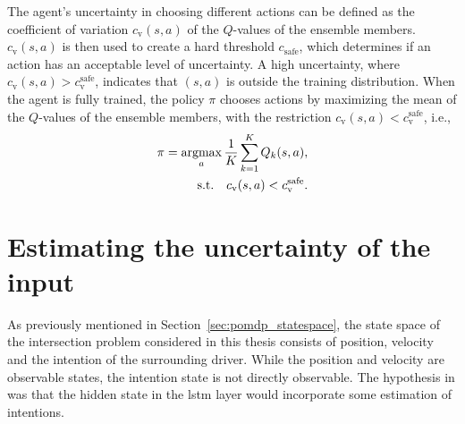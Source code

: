 The agent's uncertainty in choosing different actions can be defined as the coefficient of variation $c_\mathrm{v}(s,a)$ of the $Q$-values of the ensemble members. $c_\mathrm{v}(s,a)$ is then used to create a hard threshold $c_\mathrm{safe}$, which determines if an action has an acceptable level of uncertainty. 
A high uncertainty, where $c_\mathrm{v}(s,a) > c_\mathrm{v}^\mathrm{safe}$, indicates that $(s,a)$ is outside the training distribution. 
When the agent is fully trained, the policy $\pi$ chooses actions by maximizing the mean of the $Q$-values of the ensemble members, with the restriction $c_\mathrm{v}(s,a) < c_\mathrm{v}^\mathrm{safe}$, i.e.,
%
\begin{equation}
	\begin{aligned}
		\pi = \operatorname*{argmax}_{a} \frac{1}{K} \sum_{k=1}^K Q_k(s,a),\\
		\textrm{s.t.} \quad c_\mathrm{v}(s,a) < c_\mathrm{v}^\mathrm{safe}.
	\end{aligned}
\end{equation}
%







\section{Estimating the uncertainty of the input}

As previously mentioned in Section~\ref{sec:pomdp_statespace}, the state space of the intersection problem considered in this thesis consists of position, velocity and the intention of the surrounding driver. While the position and velocity are observable states, the intention state is not directly observable. The hypothesis in \paperLSTM was that the hidden state in the \gls{lstm} layer would incorporate some estimation of intentions. 

